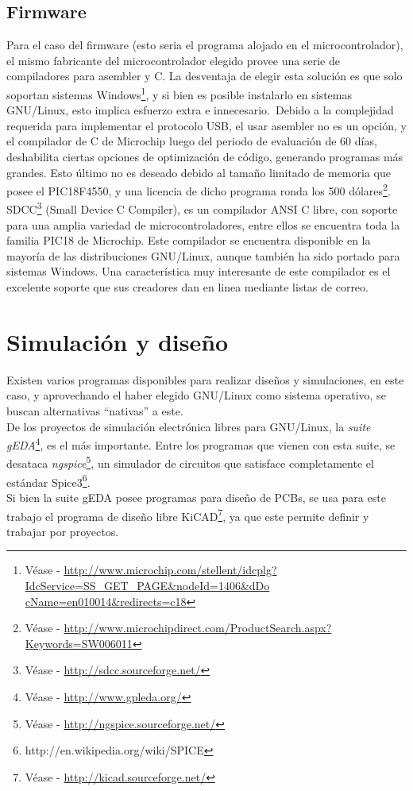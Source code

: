 \subsection{Firmware}
Para el caso del firmware (esto seria el programa alojado en el
microcontrolador), el mismo fabricante del microcontrolador elegido provee una
serie de compiladores para asembler y C. La desventaja de elegir esta
soluci\'on es que solo soportan sistemas Windows\footnote{V\'ease -
\url{
http://www.microchip.com/stellent/idcplg?IdcService=SS_GET_PAGE&nodeId=1406&dDo
cName=en010014&redirects=c18}}, y si bien es posible instalarlo en sistemas
GNU/Linux, esto implica esfuerzo extra e innecesario.\
Debido a la complejidad requerida para implementar el protocolo USB, el usar
asembler no es un opci\'on, y el compilador de C de Microchip luego del
periodo de evaluaci\'on de 60 d\'ias, deshabilita ciertas opciones de
optimizaci\'on de c\'odigo, generando programas m\'as grandes. Esto \'ultimo no
es
deseado debido al tama\~no limitado de memoria que posee el PIC18F4550, y una
licencia de dicho programa ronda los 500 d\'olares\footnote{V\'ease -
\url{http://www.microchipdirect.com/ProductSearch.aspx?Keywords=SW006011}}.\\

SDCC\footnote{V\'ease - \url{http://sdcc.sourceforge.net/}} (Small Device C
Compiler), es un compilador ANSI C libre, con soporte para una amplia variedad
de microcontroladores, entre ellos se encuentra toda la familia PIC18 de
Microchip. Este compilador se encuentra disponible en la mayor\'ia de las
distribuciones GNU/Linux, aunque tambi\'en ha sido portado para sistemas
Windows. Una caracter\'istica muy interesante de este compilador es el
excelente
soporte que sus creadores dan en linea mediante listas de correo.\\


\section{Simulaci\'on y dise\~no}
Existen varios programas disponibles para realizar dise\~nos y simulaciones,
en este caso, y aprovechando el haber elegido GNU/Linux como sistema
operativo, se buscan alternativas ``nativas'' a este.\\

De los proyectos de simulaci\'on electr\'onica libres para GNU/Linux, la
\emph{suite gEDA}\footnote{V\'ease - \url{http://www.gpleda.org/}}, es el m\'as
importante. Entre los programas que vienen con esta suite, se desataca
\emph{ngspice}\footnote{V\'ease - \url{http://ngspice.sourceforge.net/}}, un
simulador de circuitos que satisface completamente el est\'andar
Spice3\footnote{http://en.wikipedia.org/wiki/SPICE}.\\

Si bien la suite gEDA posee programas para dise\~no de PCBs, se usa para este
trabajo el programa de dise\~no libre KiCAD\footnote{V\'ease -
\url{http://kicad.sourceforge.net/}}, ya que este permite definir y trabajar
por proyectos.






